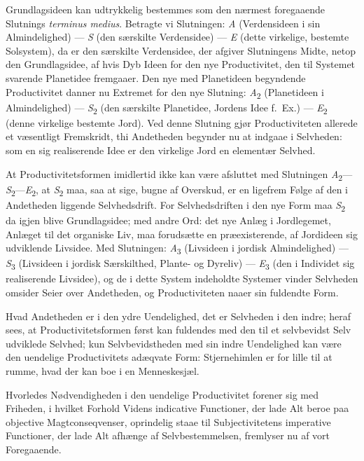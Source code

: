 \documentclass[12pt]{book}
\newcommand{\opage}[1]{\marginnote{\footnotesize\textit{[#1]}}}
\begin{document}
Grundlagsideen kan udtrykkelig bestemmes som den nærmest foregaaende Slutnings \textit{terminus medius}. Betragte vi Slutningen: \textit{A} (Verdensideen i sin Almindelighed) --- \textit{S} (den særskilte Verdensidee) --- \textit{E} (dette virkelige, bestemte Solsystem), da er den særskilte Verdensidee, der afgiver Slutningens Midte, netop den Grundlagsidee, af hvis Dyb Ideen for den nye Productivitet, den til Systemet svarende Planetidee fremgaaer. Den nye med Planetideen begyndende Productivitet danner nu Extremet for den nye Slutning: \textit{A}\textsubscript{2} (Planetideen i Almindelighed) --- \textit{S}\textsubscript{2} (den særskilte Planetidee,
\opage{448}Jordens Idee f.\ Ex.) --- \textit{E}\textsubscript{2} (denne virkelige bestemte Jord). Ved denne Slutning gjør Productiviteten allerede et væsentligt Fremskridt, thi Andetheden begynder nu at indgaae i Selvheden: som en sig realiserende Idee er den virkelige Jord en elementær Selvhed.

At Productivitetsformen imidlertid ikke kan være afsluttet med Slutningen \textit{A}\textsubscript{2}---\textit{S}\textsubscript{2}---\textit{E}\textsubscript{2}, at \textit{S}\textsubscript{2} maa, saa at sige, bugne af Overskud, er en ligefrem Følge af den i Andetheden liggende Selvhedsdrift. For Selvhedsdriften i den nye Form maa \textit{S}\textsubscript{2} da igjen blive Grundlagsidee; med andre Ord: det nye Anlæg i Jordlegemet, Anlæget til det organiske Liv, maa forudsætte en præexisterende, af Jordideen sig udviklende Livsidee. Med Slutningen: \textit{A}\textsubscript{3} (Livsideen i jordisk Almindelighed) --- \textit{S}\textsubscript{3} (Livsideen i jordisk Særskilthed, Plante- og Dyreliv) --- \textit{E}\textsubscript{3} (den i Individet sig realiserende Livsidee), og de i dette System indeholdte Systemer vinder Selvheden omsider Seier over Andetheden, og Productiviteten naaer sin fuldendte Form.

Hvad Andetheden er i den ydre Uendelighed, det er Selvheden i den indre; heraf sees, at Productivitetsformen først kan fuldendes med den til et selvbevidst Selv udviklede Selvhed; kun Selvbevidstheden med sin indre Uendelighed kan være den uendelige Productivitets adæqvate Form: Stjernehimlen er for lille til at rumme, hvad der kan boe i en Menneskesjæl.

Hvorledes Nødvendigheden i den uendelige Productivitet forener sig med Friheden, i hvilket Forhold Videns indicative Functioner, der lade Alt beroe paa objective Magtconseqvenser, oprindelig staae til Subjectivitetens imperative Functioner, der lade Alt afhænge af Selvbestemmelsen, fremlyser nu af vort Foregaaende.
\end{document}
